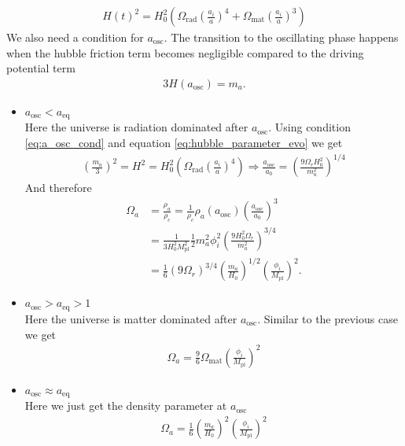 \documentclass[a4paper]{article}
\begin{document}
\begin{align}
    \label{eq:hubble_parameter_evo}
    H(t)^2 = H_0^2 \left(
        \Omega_\mathrm{rad} \left( \frac{a_i}{a} \right)^4 +
        \Omega_\mathrm{mat} \left( \frac{a_i}{a} \right)^3
    \right)
\end{align}
We also need a condition for $a_\mathrm{osc}$. The transition to the oscillating phase happens when the
hubble friction term becomes negligible compared to the driving potential term
\begin{align}
    \label{eq:a_osc_cond}
    3 H(a_\mathrm{osc}) = m_a.
\end{align}
\begin{itemize}
    \item $a_\mathrm{osc} < a_\mathrm{eq}$ \\
    Here the universe is radiation dominated after $a_\mathrm{osc}$.
    Using condition \ref{eq:a_osc_cond} and equation \ref{eq:hubble_parameter_evo} we get
    \begin{align*}
        \left(\frac{m_a}{3}\right)^2 = H^2 = H_0^2 \left(
        \Omega_\mathrm{rad} \left( \frac{a_i}{a} \right)^4
    \right) \Rightarrow \frac{a_\mathrm{osc}}{a_0} = \left( \frac{9 \Omega_r H_0^2}{m_a^2} \right)^{1/4}
    \end{align*}
    And therefore
    \begin{align*}
        \Omega_a &= \frac{\rho_a}{\rho_c} = \frac{1}{\rho_c} \rho_a(a_\mathrm{osc}) \left( \frac{a_\mathrm{osc}}{a_0} \right)^3 \\
                 &= \frac{1}{3 H_0^2 M_\mathrm{pl}^2} \frac{1}{2} m_a^2 \phi_i^2 \left( \frac{9 H_0^2 \Omega_r}{m_a^2} \right)^{3/4} \\
                 &= \frac{1}{6} \left( 9 \Omega_r \right)^{3/4} \left( \frac{m_a}{H_0} \right)^{1/2} \left( \frac{\phi_i}{M_\mathrm{pl}} \right)^2.
    \end{align*}
    \item $a_\mathrm{osc} > a_\mathrm{eq} > 1$ \\
    Here the universe is matter dominated after $a_\mathrm{osc}$.
    Similar to the previous case we get
    \begin{align*}
        \Omega_a = \frac{9}{6} \Omega_\mathrm{mat} \left( \frac{\phi_i}{M_\mathrm{pl}} \right)^2
    \end{align*}
    \item $a_\mathrm{osc} \approx a_\mathrm{eq}$ \\
    Here we just get the density parameter at $a_\mathrm{osc}$
    \begin{align*}
        \Omega_a = \frac{1}{6} \left( \frac{m_a}{H_0} \right)^2 \left( \frac{\phi_i}{M_\mathrm{pl}} \right)^2
    \end{align*}
\end{itemize}
\end{document}
